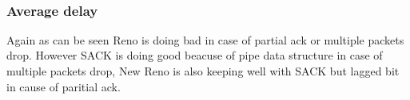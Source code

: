 \documentclass[11pt]{article}
\begin{document}
    \begin{center}
    \end{center}
    { \hspace*{\fill} \\}
    
    \subsubsection{Average delay}\label{average-delay}

Again as can be seen Reno is doing bad in case of partial ack or
multiple packets drop. However SACK is doing good beacuse of pipe data
structure in case of multiple packets drop, New Reno is also keeping
well with SACK but lagged bit in cause of paritial ack.
\end{document}
